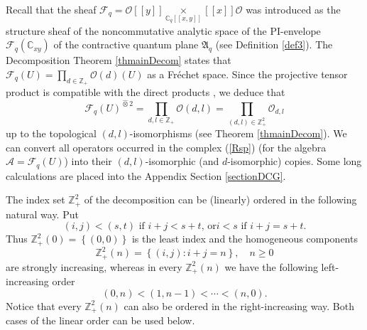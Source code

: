 \documentclass[12pt,reqno]{amsart}%
\theoremstyle{plain}
\numberwithin{theorem}{section} \numberwithin{equation}{section}
\numberwithin{lemma}{section}
\numberwithin{remark}{section}
\numberwithin{example}{section}
\numberwithin{proposition}{section}
\numberwithin{definition}{section}
\numberwithin{corollary}{section}
\begin{document}
Recall that the sheaf $\mathcal{F}_{q}=\mathcal{O}\left[  \left[  y\right]
\right]  \underset{\mathbb{C}_{q}\left[  \left[  x,y\right]  \right]
}{\times}\left[  \left[  x\right]  \right]  \mathcal{O}$ was introduced as the
structure sheaf of the noncommutative analytic space of the PI-envelope
$\mathcal{F}_{q}\left(  \mathbb{C}_{xy}\right)  $ of the contractive quantum
plane $\mathfrak{A}_{q}$ (see Definition \ref{def3}). The Decomposition
Theorem \ref{thmainDecom} states that $\mathcal{F}_{q}\left(  U\right)
=\prod\limits_{d\in\mathbb{Z}_{+}}\mathcal{O}\left(  d\right)  \left(
U\right)  $ as a Fr\'{e}chet space. Since the projective tensor product is
compatible with the direct products \cite[II.5.19]{HelHom}, we deduce that
\[
\mathcal{F}_{q}\left(  U\right)  ^{\widehat{\otimes}2}=\prod\limits_{d,l\in
\mathbb{Z}_{+}}\mathcal{O}\left(  d,l\right)  =\prod\limits_{\left(
d,l\right)  \in\mathbb{Z}_{+}^{2}}\mathcal{O}_{d,l}%
\]
up to the topological $\left(  d,l\right)  $-isomorphisms (see Theorem
\ref{thmainDecom}). We can convert all operators occurred in the complex
(\ref{Rsp}) (for the algebra $\mathcal{A=F}_{q}\left(  U\right)  $) into their
$\left(  d,l\right)  $-isomorphic (and $d$-isomorphic) copies. Some long
calculations are placed into the Appendix Section \ref{sectionDCG}.

The index set $\mathbb{Z}_{+}^{2}$ of the decomposition can be (linearly)
ordered in the following natural way. Put
\begin{equation}
\left(  i,j\right)  <\left(  s,t\right)  \text{ if }i+j<s+t\text{, or
}i<s\text{ if }i+j=s+t\text{.}\label{oI}%
\end{equation}
Thus $\mathbb{Z}_{+}^{2}\left(  0\right)  =\left\{  \left(  0,0\right)
\right\}  $ is the least index and the homogeneous components
\[
\mathbb{Z}_{+}^{2}\left(  n\right)  =\left\{  \left(  i,j\right)
:i+j=n\right\}  ,\quad n\geq0
\]
are strongly increasing, whereas in every $\mathbb{Z}_{+}^{2}\left(  n\right)
$ we have the following left-increasing order
\[
\left(  0,n\right)  <\left(  1,n-1\right)  <\cdots<\left(  n,0\right)  .
\]
Notice that every $\mathbb{Z}_{+}^{2}\left(  n\right)  $ can also be ordered
in the right-increasing way. Both cases of the linear order can be used below.
\end{document}
